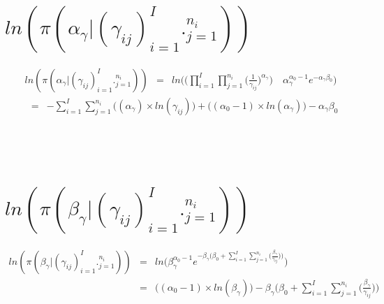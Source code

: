 \documentclass[10pt]{report}
\theoremstyle{plain}
\begin{document}
\section{$ln(\pi(\alpha_\gamma|(\gamma_{ij})_{i=1}^I._{j=1}^{n_i}))$}
\begin{eqnarray*}
ln(\pi(\alpha_\gamma|(\gamma_{ij})_{i=1}^I._{j=1}^{n_i})) &=& ln\Bigg(\Bigg(\prod_{i=1}^I \prod_{j=1}^{n_i} \Big(\frac{1}{\gamma_{ij}}\Big)^{\alpha_\gamma}\Bigg) \quad \alpha_\gamma^{\alpha_0-1}e^{-\alpha_\gamma\beta_0}\Bigg)
\end{eqnarray*}
\begin{eqnarray*}
&=& -\sum_{i=1}^I \sum_{j=1}^{n_i} \big((\alpha_\gamma)\times ln(\gamma_{ij})\big)+\big((\alpha_0-1)\times ln(\alpha_\gamma)\big)-\alpha_\gamma\beta_0
\end{eqnarray*}
\\
\\
\\
\section{$ln(\pi(\beta_\gamma|(\gamma_{ij})_{i=1}^I._{j=1}^{n_i}))$}
\begin{eqnarray*}
ln(\pi(\beta_\gamma|(\gamma_{ij})_{i=1}^I._{j=1}^{n_i}))&=&ln\Bigg(\beta_\gamma^{\alpha_0-1} e^{-\beta_\gamma\big(\beta_0+\sum_{i=1}^I \sum_{j=1}^{n_i}\big(\frac{\beta_\gamma}{\gamma_{ij}}\big))}\Bigg)\\
&=&\Bigg((\alpha_0-1)\times ln(\beta_\gamma)\big)-\beta_\gamma\bigg(\beta_0+\sum_{i=1}^I \sum_{j=1}^{n_i}\big(\frac{\beta_\gamma}{\gamma_{ij}}\bigg)\Bigg)
\end{eqnarray*}
\end{document}
